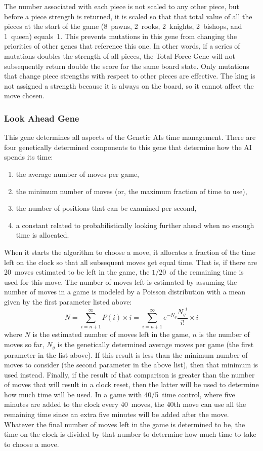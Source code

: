 \documentclass[letter]{article}
\renewcommand\_{\textunderscore\allowbreak}
\begin{document}
The number associated with each piece is not scaled to any other piece, but before a piece strength is returned, it is scaled so that that total value of all the pieces at the start of the game (8~pawns, 2~rooks, 2~knights, 2~bishops, and 1~queen) equals~1. This prevents mutations in this gene from changing the priorities of other genes that reference this one. In other words, if a series of mutations doubles the strength of all pieces, the Total Force Gene will not subsequently return double the score for the same board state. Only mutations that change piece strengths with respect to other pieces are effective. The king is not assigned a strength because it is always on the board, so it cannot affect the move chosen.

\subsubsection{Look Ahead Gene}
This gene determines all aspects of the Genetic AIs time management. There are four genetically determined components to this gene that determine how the AI spends its time:
\begin{enumerate}
	\item the average number of moves per game,
	\item the minimum number of moves (or, the maximum fraction of time to use),
	\item the number of positions that can be examined per second,
	\item a constant related to probabilistically looking further ahead when no enough time is allocated.
\end{enumerate}
When it starts the algorithm to choose a move, it allocates a fraction of the time left on the clock so that all subsequent moves get equal time. That is, if there are 20~moves estimated to be left in the game, the $1/20$~of the remaining time is used for this move. The number of moves left is estimated by assuming the number of moves in a game is modeled by a Poisson distribution with a mean given by the first parameter listed above:
$$N = \sum_{i = n + 1}^\infty P(i)\times{}i = \sum_{i = n + 1}^\infty e^{-N_g}\frac{N_g^{\phantom{g}i}}{i!}\times{}i$$
where $N$ is the estimated number of moves left in the game, $n$ is the number of moves so far, $N_g$ is the genetically determined average moves per game (the first parameter in the list above). If this result is less than the minimum number of moves to consider (the second parameter in the above list), then that minimum is used instead. Finally, if the result of that comparison is greater than the number of moves that will result in a clock reset, then the latter will be used to determine how much time will be used. In a game with 40/5~time control, where five minutes are added to the clock every 40~moves, the 40th move can use all the remaining time since an extra five minutes will be added after the move. Whatever the final number of moves left in the game is determined to be, the time on the clock is divided by that number to determine how much time to take to choose a move.
\end{document}

